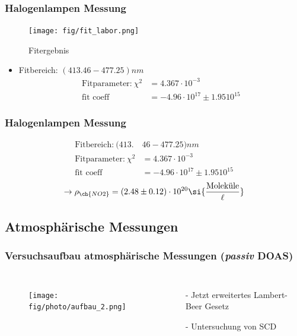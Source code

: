 \documentclass{beamer}
\begin{document}
\begin{frame}
	\frametitle{Halogenlampen Messung}
     \begin{figure}[h]
    	\texttt{[image: fig/fit\_labor.png]}
    	\caption{Fitergebnis}
    \end{figure}
    \begin{itemize} 
    	\item Fitbereich: $(413.46 - 477.25) \si{nm}$
    		\begin{align}
    		   \text{Fitparameter:}\ \chi^2 &= 4.367 \cdot 10^{-3}\\
    		   \text{fit coeff} &= -4.96 \cdot 10^{17} \pm 1.95 10^{15}
    		\end{align}
    \end{itemize}
\end{frame} 

\begin{frame}
	\frametitle{Halogenlampen Messung}
	\begin{align}
		\text{Fitbereich:}\ (413.&46 - 477.25) \si{nm}\\
		\text{Fitparameter:}\ \chi^2 &= 4.367 \cdot 10^{-3}\\
		\text{fit coeff} &= -4.96 \cdot 10^{17} \pm 1.95 10^{15}
	\end{align}
	\begin{align}    
		\to \rho_{\ch{NO2}} = (2.48 \pm 0.12) \cdot 10^{20} \si{\frac{\text{Moleküle}}{\ell}}
	\end{align}
\end{frame}

\begin{frame}
    \section{Atmosphärische Messungen}
    \frametitle{Versuchsaufbau atmosphärische Messungen (\textit{passiv} DOAS)}
     \begin{columns}
    		\begin{figure}[h]
    			\texttt{[image: fig/photo/aufbau\_2.png]}
    		\end{figure}
    		\begin{itemize}
    			\item[-] Jetzt erweitertes Lambert-Beer Gesetz
    			\item[-] Untersuchung von SCD
    		\end{itemize}
    \end{columns}
\end{frame}
\end{document}
